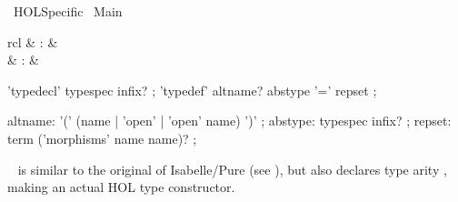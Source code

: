 %
\begin{isabellebody}%
\def\isabellecontext{HOL{\isacharunderscore}Specific}%
%
\isadelimtheory
\isanewline
\isanewline
%
\endisadelimtheory
%
\isatagtheory
{}\isamarkupfalse%
\ HOL{\isacharunderscore}Specific\isanewline
{}\ Main\isanewline
{}%
\endisatagtheory
{\isafoldtheory}%
%
\isadelimtheory
%
\endisadelimtheory
%
\isamarkuptrue%
%
\isamarkuptrue%
%
\begin{isamarkuptext}%
\begin{matharray}{rcl}
    \hypertarget{command.HOL.typedecl}{\hyperlink{command.HOL.typedecl}{\mbox{}}} & : &  \\
    \hypertarget{command.HOL.typedef}{\hyperlink{command.HOL.typedef}{\mbox{}}} & : &  \\
  \end{matharray}

  \begin{rail}
    'typedecl' typespec infix?
    ;
    'typedef' altname? abstype '=' repset
    ;

    altname: '(' (name | 'open' | 'open' name) ')'
    ;
    abstype: typespec infix?
    ;
    repset: term ('morphisms' name name)?
    ;
  \end{rail}

  \begin{description}
  
  \item \hyperlink{command.HOL.typedecl}{\mbox{}}~ is similar
  to the original \hyperlink{command.typedecl}{\mbox{}} of Isabelle/Pure (see
  ), but also declares type arity , making  an actual HOL type
  constructor.  %
  

\end{description}
\end{isamarkuptext}
\end{isabellebody}
